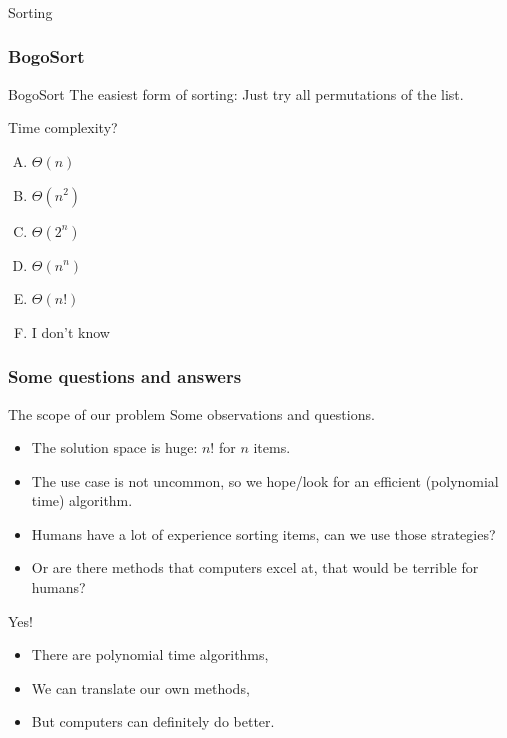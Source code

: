 \begin{frame}[fragile]\frametitle{}
\begin{center}
{\Large Sorting}
\end{center}

\end{frame}


\begin{frame}
	\frametitle{BogoSort}
		\begin{block}{BogoSort}
			The easiest form of sorting: Just try all permutations of the list.
		\end{block}	
		\pause
		\begin{block}{Time complexity?}
			\begin{enumerate}[A.]
				\item $\Theta(n)$
				\item $\Theta(n^2)$
				\item $\Theta(2^n)$
				\item $\Theta(n^n)$
				\item $\Theta(n!)$
				\item I don't know
			\end{enumerate}
		\end{block}
	
\end{frame}

\begin{frame}
	\frametitle{Some questions and answers}
\begin{block}{The scope of our problem}
	Some observations and questions.
	\begin{itemize}
		\item The solution space is huge: $n!$ for $n$ items.
			\pause
		\item The use case is not uncommon, so we hope/look for an efficient (polynomial time) algorithm.
			\pause
		\item Humans have a lot of experience sorting items, can we use those strategies?
			\pause
		\item Or are there methods that computers excel at, that would be terrible for humans?
	\end{itemize}
\end{block}	
\pause
\begin{block}{Yes!}
	\begin{itemize}
		\item There are polynomial time algorithms,
			\pause
		\item We can translate our own methods,
		\item But computers can definitely do better.
	\end{itemize}
\end{block}
\end{frame}


